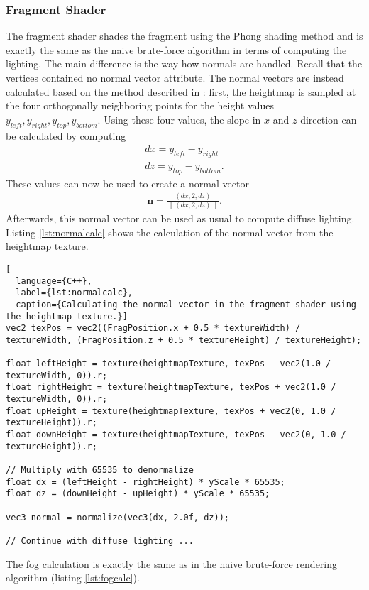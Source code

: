 \subsubsection{Fragment Shader}
The fragment shader shades the fragment using the Phong shading method
and is exactly the same as the naive brute-force algorithm in terms of computing the lighting. The main 
difference is the way how normals are handled. 
Recall that the vertices contained no normal vector attribute.
The normal vectors are instead calculated based on the method described in \cite{procsplattingdice}:
first, the heightmap is sampled at the four orthogonally neighboring points for the height values $y_{left}, y_{right}, y_{top}, y_{bottom}$.
Using these four values, the slope in $x$ and $z$-direction can be calculated by computing
\begin{align*}
  dx = y_{left} - y_{right}\\
  dz = y_{top} - y_{bottom}.
\end{align*}
These values can now be used to create a normal vector
\begin{align*}
  \mathbf{n} = \frac{(dx, 2, dz)}{\lVert (dx, 2, dz) \rVert}.
\end{align*}
Afterwards, this normal vector can be used as usual to compute diffuse lighting.
Listing \ref{lst:normalcalc} shows the calculation of the normal vector from the heightmap texture.

\begin{lstlisting}[
  language={C++},
  label={lst:normalcalc},
  caption={Calculating the normal vector in the fragment shader using the heightmap texture.}]
vec2 texPos = vec2((FragPosition.x + 0.5 * textureWidth) / textureWidth, (FragPosition.z + 0.5 * textureHeight) / textureHeight);

float leftHeight = texture(heightmapTexture, texPos - vec2(1.0 / textureWidth, 0)).r;
float rightHeight = texture(heightmapTexture, texPos + vec2(1.0 / textureWidth, 0)).r;
float upHeight = texture(heightmapTexture, texPos + vec2(0, 1.0 / textureHeight)).r;
float downHeight = texture(heightmapTexture, texPos - vec2(0, 1.0 / textureHeight)).r;

// Multiply with 65535 to denormalize
float dx = (leftHeight - rightHeight) * yScale * 65535;
float dz = (downHeight - upHeight) * yScale * 65535;

vec3 normal = normalize(vec3(dx, 2.0f, dz));

// Continue with diffuse lighting ...
\end{lstlisting}

The fog calculation is exactly the same as in the naive brute-force rendering algorithm (listing \ref{lst:fogcalc}).
